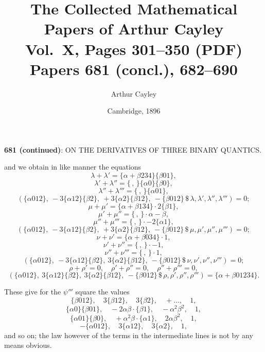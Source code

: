 \documentclass[11pt,a4paper]{article}
\title{The Collected Mathematical Papers of Arthur Cayley\\[6pt]
\large Vol.~X, Pages 301--350 (PDF) \\[4pt]
\normalsize Papers 681 (concl.), 682--690}
\author{Arthur Cayley}
\date{Cambridge, 1896}
\begin{document}
\maketitle
\thispagestyle{fancy}

\setcounter{page}{301}



\begin{center}
\textbf{681 (continued)}: ON THE DERIVATIVES OF THREE BINARY QUANTICS.
\end{center}

\medskip

\noindent and we obtain in like manner the equations
\[
\lambda + \lambda' = \{\alpha + \beta 234\}\{\beta 01\},
\]
\[
\lambda' + \lambda'' = \{\,,\,\}\{\alpha 0\}\{\beta 0\},
\]
\[
\lambda'' + \lambda''' = \{\,,\,\}\{\alpha 01\},
\]
\[
(\{\alpha 012\},\ -3\{\alpha 12\}\{\beta 2\},\ +3\{\alpha 2\}\{\beta 12\},\ -\{\beta 012\}\,\$\,\lambda, \lambda', \lambda'', \lambda''') = 0;
\]
\[
\mu + \mu' = \{\alpha + \beta 134\}\cdot 2\{\beta 1\},
\]
\[
\mu' + \mu'' = \{\,,\,\}\cdot \alpha - \beta,
\]
\[
\mu'' + \mu''' = \{\,,\,\}\cdot -2\{\alpha 1\},
\]
\[
(\{\alpha 012\},\ -3\{\alpha 12\}\{\beta 2\},\ +3\{\alpha 2\}\{\beta 12\},\ -\{\beta 012\}\,\$\,\mu, \mu', \mu'', \mu''') = 0;
\]
\[
\nu + \nu' = \{\alpha + \beta 034\}\cdot 1,
\]
\[
\nu' + \nu'' = \{\,,\,\}\cdot -1,
\]
\[
\nu'' + \nu''' = \{\,,\,\}\cdot 1,
\]
\[
(\{\alpha 012\},\ -3\{\alpha 12\}\{\beta 2\},\ 3\{\alpha 2\}\{\beta 12\},\ -\{\beta 012\}\,\$\,\nu, \nu', \nu'', \nu''') = 0;
\]
\[
\rho + \rho' = 0,\quad \rho' + \rho'' = 0,\quad \rho'' + \rho''' = 0,
\]
\[
(\{\alpha 012\},\ 3\{\alpha 12\}\{\beta 2\},\ 3\{\alpha 2\}\{\beta 12\},\ -\{\beta 012\}\,\$\,\rho, \rho', \rho'', \rho''') = \{\alpha + \beta 01234\}.
\]

These give for the $\psi'''$ square the values
\[
\{\beta 012\}, \quad 3\{\beta 12\}, \quad 3\{\beta 2\}, \quad +\ldots, \quad 1,
\]
\[
\{\alpha 0\}\{\beta 01\}, \quad -2\alpha\beta\cdot\{\beta 1\}, \quad -\alpha^{2}\beta^{2}, \quad 1,
\]
\[
\{\alpha 01\}\{\beta 0\}, \quad +\alpha^{2}\beta\cdot\{\alpha 1\}, \quad 2\alpha\beta^{2}, \quad 1,
\]
\[
-\{\alpha 012\}, \quad 3\{\alpha 12\}, \quad 3\{\alpha 2\}, \quad 1,
\]
and so on; the law however of the terms in the intermediate lines is not by any means obvious.
\end{document}
